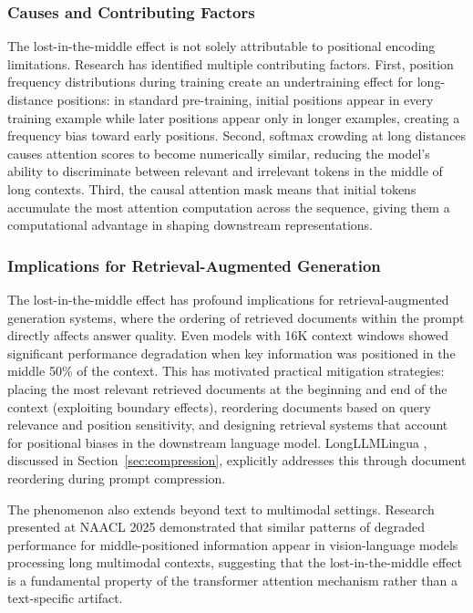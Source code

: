 \documentclass[11pt,letterpaper]{article}
\begin{document}
\subsubsection{Causes and Contributing Factors}

The lost-in-the-middle effect is not solely attributable to positional encoding limitations. Research has identified multiple contributing factors. First, position frequency distributions during training create an undertraining effect for long-distance positions: in standard pre-training, initial positions appear in every training example while later positions appear only in longer examples, creating a frequency bias toward early positions. Second, softmax crowding at long distances causes attention scores to become numerically similar, reducing the model's ability to discriminate between relevant and irrelevant tokens in the middle of long contexts. Third, the causal attention mask means that initial tokens accumulate the most attention computation across the sequence, giving them a computational advantage in shaping downstream representations.

\subsubsection{Implications for Retrieval-Augmented Generation}

The lost-in-the-middle effect has profound implications for retrieval-augmented generation systems, where the ordering of retrieved documents within the prompt directly affects answer quality. Even models with 16K context windows showed significant performance degradation when key information was positioned in the middle 50\% of the context. This has motivated practical mitigation strategies: placing the most relevant retrieved documents at the beginning and end of the context (exploiting boundary effects), reordering documents based on query relevance and position sensitivity, and designing retrieval systems that account for positional biases in the downstream language model. LongLLMLingua \cite{jiang2024longllmlingua}, discussed in Section~\ref{sec:compression}, explicitly addresses this through document reordering during prompt compression.

The phenomenon also extends beyond text to multimodal settings. Research presented at NAACL 2025 demonstrated that similar patterns of degraded performance for middle-positioned information appear in vision-language models processing long multimodal contexts, suggesting that the lost-in-the-middle effect is a fundamental property of the transformer attention mechanism rather than a text-specific artifact.
\end{document}
